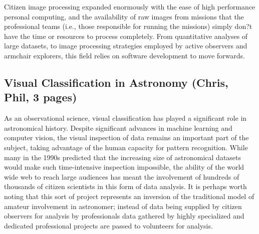 \documentclass{ar2e}
\begin{document}
Citizen image processing expanded enormously with the ease of high performance
personal computing, and the availability of raw images from missions that the
professional teams (i.e., those responsible for running the missions) simply
don?t have the time or resources to process completely.  From quantitative
analyses of large datasets, to image processing strategies employed by active
observers and armchair explorers, this field relies on software development to
move forwards.


\subsection{Visual Classification in Astronomy (\textbf{Chris}, Phil, 3 pages)}
\label{sec:class:astro}


As an observational science, visual classification has played a significant
role in astronomical history. Despite significant advances in machine learning
and computer vision, the visual inspection of data remains an important part
of the subject, taking advantage of the human capacity for pattern
recognition. While many in the 1990s predicted that the increasing size of
astronomical datasets would make such time-intensive inspection impossible,
the ability of the world wide web to reach large audiences has meant the
involvement of hundreds of thousands of citizen scientists in this form of
data analysis. It is perhaps worth noting that this sort of project represents
an inversion of the traditional model of amateur involvement in astronomer;
instead of data being supplied by citizen observers for analysis by
professionals data gathered by highly specialized and dedicated professional
projects are passed to volunteers for analysis. 
\end{document}
